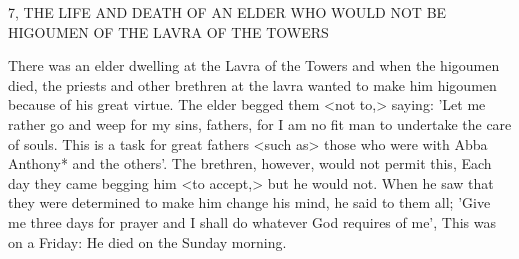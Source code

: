 7, THE LIFE AND DEATH OF AN ELDER
WHO WOULD NOT BE HIGOUMEN
OF THE LAVRA OF THE TOWERS

There was an elder dwelling at the Lavra of the Towers and when
the higoumen died, the priests and other brethren at the lavra
wanted to make him higoumen because of his great virtue. The elder
begged them <not to,> saying: 'Let me rather go and weep for my
sins, fathers, for I am no fit man to undertake the care of souls.
This is a task for great fathers <such as> those who were with
Abba Anthony* and the others'. The brethren, however, would not
permit this, Each day they came begging him <to accept,> but he
would not. When he saw that they were determined to make him
change his mind, he said to them all; 'Give me three days for prayer
and I shall do whatever God requires of me', This was on a Friday:
He died on the Sunday morning.

